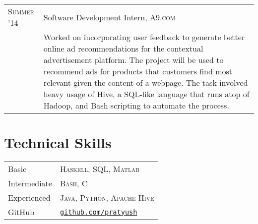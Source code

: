\documentclass[10pt]{article}
\begin{document}
\begin{tabular}{R{2.5cm}p{13cm}}
  \textsc{Summer '14}     & Software Development Intern, \textsc{A9.com}\\

                          &\footnotesize{%
                             Worked on incorporating user feedback to generate
                             better online ad recommendations for the
                             contextual advertisement platform. The project
                             will be used to recommend ads for products that
                             customers find most relevant given the content of
                             a webpage. The task involved heavy usage of Hive,
                             a SQL-like language that runs atop of Hadoop, and
                             Bash scripting to automate the process.
                            }
\end{tabular}


\nocite{*}
\printbibliography{}

\section{Technical Skills}
\begin{tabular}{R{2.5cm}l}
  Basic         & \textsc{Haskell}, \textsc{SQL}, \textsc{Matlab}\\
  Intermediate  & \textsc{Bash, C}\\
  Experienced   & \textsc{Java, Python, Apache Hive}\\
  GitHub        & \href{https://www.github.com/pratyush}{\texttt{github.com/pratyush}}
\end{tabular}
\end{document}
